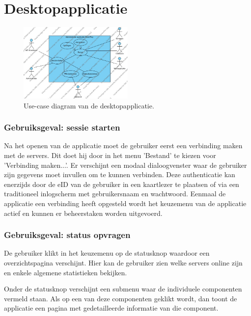 \section{Desktopapplicatie}


\begin{figure}[h!]
	\centering
		\includegraphics[width=0.5\textwidth]{images/analyse/ucd_desktop}
	\caption{Use-case diagram van de desktopapplicatie.}
\end{figure}

\subsubsection{Gebruiksgeval: sessie starten}
Na het openen van de applicatie moet de gebruiker eerst een verbinding maken met de servers. Dit doet hij door in het menu 'Bestand' te kiezen voor 'Verbinding maken...'. Er verschijnt een modaal dialoogvenster waar de gebruiker zijn gegevens moet invullen om te kunnen verbinden. Deze authenticatie kan enerzijds door de eID van de gebruiker in een kaartlezer te plaatsen of via een traditioneel inlogscherm met gebruikersnaam en wachtwoord. Eenmaal de applicatie een verbinding heeft opgesteld wordt het keuzemenu van de applicatie actief en kunnen er beheerstaken worden uitgevoerd.

\subsubsection{Gebruiksgeval: status opvragen}
De gebruiker klikt in het keuzemenu op de statusknop waardoor een overzichtspagina verschijnt. Hier kan de gebruiker zien welke servers online zijn en enkele algemene statistieken bekijken.

Onder de statusknop verschijnt een submenu waar de individuele componenten vermeld staan. Als op een van deze componenten geklikt wordt, dan toont de applicatie een pagina met gedetailleerde informatie van die component.


